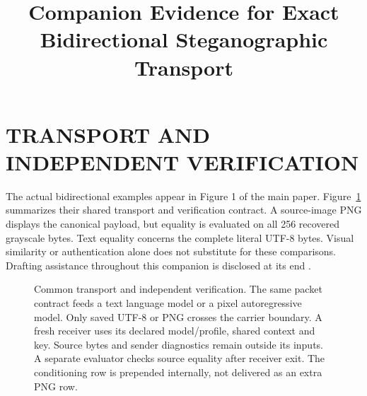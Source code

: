 \documentclass[a4paper,twoside]{article}
\begin{document}
\title{Companion Evidence for Exact Bidirectional Steganographic Transport}
\author{}
\onecolumn\maketitle\normalsize\setcounter{footnote}{0}\vfill

\section{\uppercase{Transport and Independent Verification}}
The actual bidirectional examples appear in Figure 1 of the main paper. Figure~\ref{fig:method} summarizes their shared transport and verification contract. A source-image PNG displays the canonical payload, but equality is evaluated on all 256 recovered grayscale bytes. Text equality concerns the complete literal UTF-8 bytes. Visual similarity or authentication alone does not substitute for these comparisons. Drafting assistance throughout this companion is disclosed at its end \cite{codex}.

\begin{figure}[t]
\centering

\caption{Common transport and independent verification. The same packet contract feeds a text language model or a pixel autoregressive model. Only saved UTF-8 or PNG crosses the carrier boundary. A fresh receiver uses its declared model/profile, shared context and key. Source bytes and sender diagnostics remain outside its inputs. A separate evaluator checks source equality after receiver exit. The conditioning row is prepended internally, not delivered as an extra PNG row.}
\label{fig:method}
\end{figure}
\end{document}
